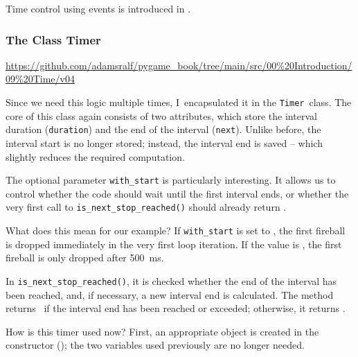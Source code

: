 \begin{hintbox}[Hint]
	Time control using events is introduced in .
\end{hintbox}

\subsubsection{The Class Timer}\label{secClassTimer}
\begin{diskbox}
	\url{https://github.com/adamsralf/pygame_book/tree/main/src/00%20Introduction/09%20Time/v04}
\end{diskbox}

Since we need this logic multiple times, I~encapsulated it in the \texttt{Timer}~class. The core of this class again consists of two attributes, which store the interval duration (\texttt{duration}) and the end of the interval (\texttt{next}). Unlike before, the interval start is no longer stored; instead, the interval end is saved -- which slightly reduces the required computation.

The optional parameter \texttt{with\_start} is particularly interesting. It allows us to control whether the code should wait until the first interval ends, or whether the very first call to \texttt{is\_next\_stop\_reached()} should already return \true.
   
What does this mean for our example? If \texttt{with\_start} is set to \true, the first fireball is dropped immediately in the very first loop iteration. If the value is \false, the first fireball is only dropped after \SI{500}{ms}.

In \texttt{is\_next\_stop\_reached()}, it is checked whether the end of the interval has been reached, and, if necessary, a new interval end is calculated. The method returns \true\ if the interval end has been reached or exceeded; otherwise, it returns \false.


How is this timer used now?  First, an appropriate object is created in the constructor (); the two variables used previously are no longer needed.


